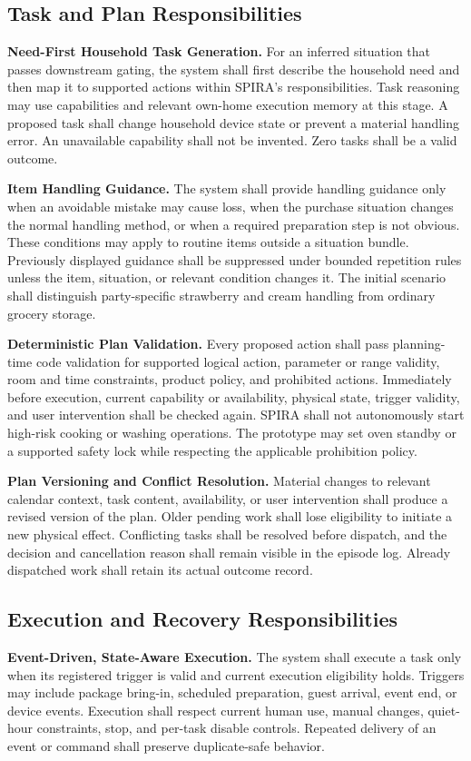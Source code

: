 \documentclass[conference]{IEEEtran}
\begin{document}
\subsection{Task and Plan Responsibilities}
\textbf{Need-First Household Task Generation.} For an inferred situation that passes downstream gating, the system shall first describe the household need and then map it to supported actions within SPIRA's responsibilities. Task reasoning may use capabilities and relevant own-home execution memory at this stage. A proposed task shall change household device state or prevent a material handling error. An unavailable capability shall not be invented. Zero tasks shall be a valid outcome.

\textbf{Item Handling Guidance.} The system shall provide handling guidance only when an avoidable mistake may cause loss, when the purchase situation changes the normal handling method, or when a required preparation step is not obvious. These conditions may apply to routine items outside a situation bundle. Previously displayed guidance shall be suppressed under bounded repetition rules unless the item, situation, or relevant condition changes it. The initial scenario shall distinguish party-specific strawberry and cream handling from ordinary grocery storage.

\textbf{Deterministic Plan Validation.} Every proposed action shall pass planning-time code validation for supported logical action, parameter or range validity, room and time constraints, product policy, and prohibited actions. Immediately before execution, current capability or availability, physical state, trigger validity, and user intervention shall be checked again. SPIRA shall not autonomously start high-risk cooking or washing operations. The prototype may set oven standby or a supported safety lock while respecting the applicable prohibition policy.

\textbf{Plan Versioning and Conflict Resolution.} Material changes to relevant calendar context, task content, availability, or user intervention shall produce a revised version of the plan. Older pending work shall lose eligibility to initiate a new physical effect. Conflicting tasks shall be resolved before dispatch, and the decision and cancellation reason shall remain visible in the episode log. Already dispatched work shall retain its actual outcome record.

\subsection{Execution and Recovery Responsibilities}
\textbf{Event-Driven, State-Aware Execution.} The system shall execute a task only when its registered trigger is valid and current execution eligibility holds. Triggers may include package bring-in, scheduled preparation, guest arrival, event end, or device events. Execution shall respect current human use, manual changes, quiet-hour constraints, stop, and per-task disable controls. Repeated delivery of an event or command shall preserve duplicate-safe behavior.
\end{document}
